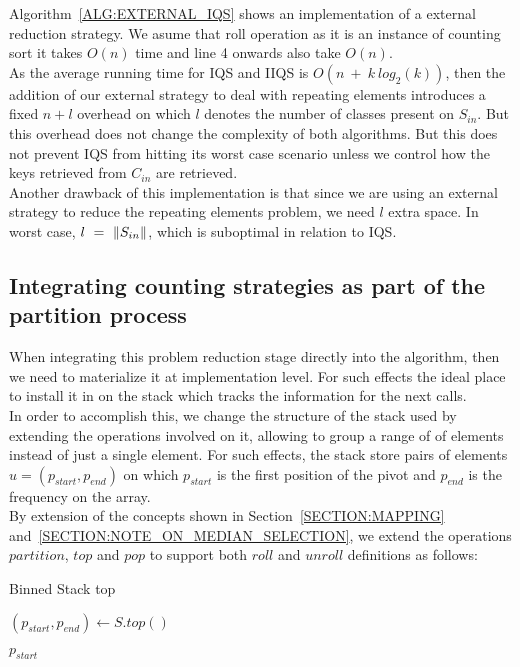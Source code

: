 Algorithm~\ref{ALG:EXTERNAL_IQS} shows an implementation of a external reduction strategy. We asume that roll operation as it is an instance of counting sort it takes $O(n)$ time and line 4 onwards also take $O(n)$. \\

As the average running time for IQS and IIQS is $O(n~+~k~log_2(k))$, then the addition of our external strategy to deal with repeating elements introduces a fixed $n + l$ overhead on which $l$ denotes the number of classes present on $S_{in}$. But this overhead does not change the complexity of both algorithms. But this does not prevent IQS from hitting its worst case scenario unless we control how the keys retrieved from $C_{in}$ are retrieved.\\

Another drawback of this implementation is that since we are using an external strategy to reduce the repeating elements problem, we need $l$ extra space. In worst case, $l~=~\lVert S_{in}\rVert$, which is suboptimal in relation to IQS.\\

\subsection{Integrating counting strategies as part of the partition process}

When integrating this problem reduction stage directly into the algorithm, then we need to materialize it at implementation level. For such effects the ideal place to install it in on the stack which tracks the information for the next calls. \\

In order to accomplish this, we change the structure of the stack used by extending the operations involved on it, allowing to group a range of of elements instead of just a single element. For such effects, the stack store pairs of elements $u = (p_{start}, p_{end})$ on which $p_{start}$ is the first position of the pivot and $p_{end}$ is the frequency on the array. \\

By extension of the concepts shown in Section~\ref{SECTION:MAPPING} and~\ref{SECTION:NOTE_ON_MEDIAN_SELECTION}, we extend the operations $partition$, $top$ and $pop$ to support both $roll$ and $unroll$ definitions as follows:



\begin{algorithm}
    \caption{Binned Stack top}\label{ALG:STACK_TOP}
    \begin{algorithmic}[1]
        \State $(p_{start}, p_{end}) \gets S.top()$
        
        \State \Return $p_{start}$
        \EndProcedure
\end{algorithmic}
\end{algorithm}


